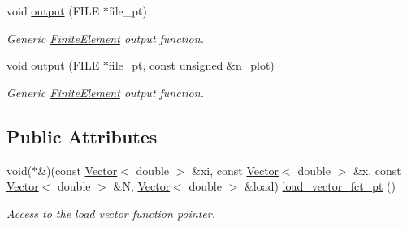 \begin{DoxyCompactItemize}
void \hyperlink{classoomph_1_1KirchhoffLoveShellEquations_adf7b87a8ee3ae1a594cd88772b7ac694}{output} (F\+I\+LE $\ast$file\+\_\+pt)
\begin{DoxyCompactList}\small\item\em Generic \hyperlink{classoomph_1_1FiniteElement}{Finite\+Element} output function. \end{DoxyCompactList}\item 
void \hyperlink{classoomph_1_1KirchhoffLoveShellEquations_a27202721c38e55112bede54676946a27}{output} (F\+I\+LE $\ast$file\+\_\+pt, const unsigned \&n\+\_\+plot)
\begin{DoxyCompactList}\small\item\em Generic \hyperlink{classoomph_1_1FiniteElement}{Finite\+Element} output function. \end{DoxyCompactList}\end{DoxyCompactItemize}
\subsection*{Public Attributes}
\begin{DoxyCompactItemize}
\item 
void($\ast$\&)(const \hyperlink{classoomph_1_1Vector}{Vector}$<$ double $>$ \&xi, const \hyperlink{classoomph_1_1Vector}{Vector}$<$ double $>$ \&x, const \hyperlink{classoomph_1_1Vector}{Vector}$<$ double $>$ \&N, \hyperlink{classoomph_1_1Vector}{Vector}$<$ double $>$ \&load) \hyperlink{classoomph_1_1KirchhoffLoveShellEquations_a92a3f04077bfcfa5d0a7879003d93801}{load\+\_\+vector\+\_\+fct\+\_\+pt} ()
\begin{DoxyCompactList}\small\item\em Access to the load vector function pointer. \end{DoxyCompactList}\end{DoxyCompactItemize}

